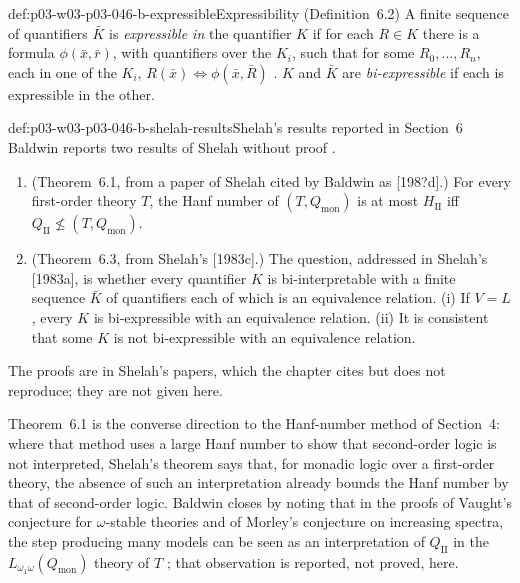 \begin{hbdefinition}{def:p03-w03-p03-046-b-expressible}{Expressibility (Definition~6.2)}
A finite sequence of quantifiers \(\bar K\) is \emph{expressible in} the
quantifier \(K\) if for each \(R\in K\) there is a formula
\(\phi(\bar x,\bar r)\), with quantifiers over the \(K_i\), such that for
some \(R_0,\dots,R_n\), each in one of the \(K_i\), \(R(\bar x)\iff
\phi(\bar x,\bar R)\) \cite[p.~477, Definition~6.2]{Baldwin1985DSOQ}.
\(K\) and \(\bar K\) are \emph{bi-expressible} if each is expressible in the
other.
\end{hbdefinition}

\begin{proofboundary}{def:p03-w03-p03-046-b-shelah-results}{Shelah's results reported in Section~6}
Baldwin reports two results of Shelah without proof
\cite[pp.~476--477]{Baldwin1985DSOQ}.
\begin{enumerate}
  \item (Theorem~6.1, from a paper of Shelah cited by Baldwin as
        [198?d].) For every first-order theory \(T\), the Hanf number of
        \((T,Q_{\mathrm{mon}})\) is at most \(H_{\mathrm{II}}\) iff
        \(Q_{\mathrm{II}}\not\le(T,Q_{\mathrm{mon}})\).
  \item (Theorem~6.3, from Shelah's [1983c].) The question, addressed in
        Shelah's [1983a], is whether every quantifier \(K\) is
        bi-interpretable with a finite sequence \(\bar K\) of quantifiers
        each of which is an equivalence relation. (i) If \(V=L\), every
        \(K\) is bi-expressible with an equivalence relation. (ii) It is
        consistent that some \(K\) is not bi-expressible with an
        equivalence relation.
\end{enumerate}
The proofs are in Shelah's papers, which the chapter cites but does not
reproduce; they are not given here.
\end{proofboundary}

Theorem~6.1 is the converse direction to the Hanf-number method of
Section~4: where that method uses a large Hanf number to show that
second-order logic is not interpreted, Shelah's theorem says that, for
monadic logic over a first-order theory, the absence of such an
interpretation already bounds the Hanf number by that of second-order
logic. Baldwin closes by noting that in the proofs of Vaught's conjecture
for \(\omega\)-stable theories and of Morley's conjecture on increasing
spectra, the step producing many models can be seen as an interpretation
of \(Q_{\mathrm{II}}\) in the \(L_{\omega_1\omega}(Q_{\mathrm{mon}})\)
theory of \(T\) \cite[p.~477]{Baldwin1985DSOQ}; that observation is
reported, not proved, here.

